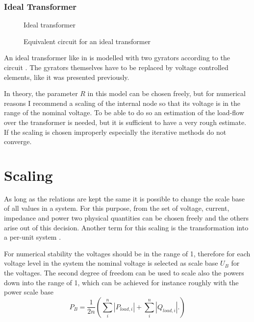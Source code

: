 \subsubsection{Ideal Transformer}

\begin{figure}
	\centering
	
	\caption{Ideal transformer}
	\label{fig:ideal_transformer_original}
\end{figure}

\begin{figure}
	\centering
	
	\caption{Equivalent circuit for an ideal transformer}
	\label{fig:ideal_transformer_equivalent}
\end{figure}

An ideal transformer like in  is modelled with two gyrators according to the circuit . The gyrators themselves have to be replaced by voltage controlled elements, like it was presented previously.

In theory, the parameter $R$ in this model can be chosen freely, but for numerical reasons I recommend a scaling of the internal node so that its voltage is in the range of the nominal voltage. To be able to do so an estimation of the load-flow over the transformer is needed, but it is sufficient to have a very rough estimate. If the scaling is chosen improperly especially the iterative methods do not converge.

\section{Scaling}
\label{sec:scaling}

As long as the relations are kept the same it is possible to change the scale base of all values in a system. For this purpose, from the set of voltage, current, impedance and power two physical quantities can be chosen freely and the others arise out of this decision. Another term for this scaling is the transformation into a per-unit system \citep[p. 90]{powerSystemAnalysis}.

For numerical stability the voltages should be in the range of 1, therefore for each voltage level in the system the nominal voltage is selected as scale base $U_B$ for the voltages. The second degree of freedom can be used to scale also the powers down into the range of 1, which can be achieved for instance roughly with the power scale base
\begin{equation}
	P_B = \frac{1}{2n} \left( \sum_{i}^n \left| P_{load,i} \right| + \sum_{i}^n \left| Q_{load,i} \right|. \right)
\end{equation}

